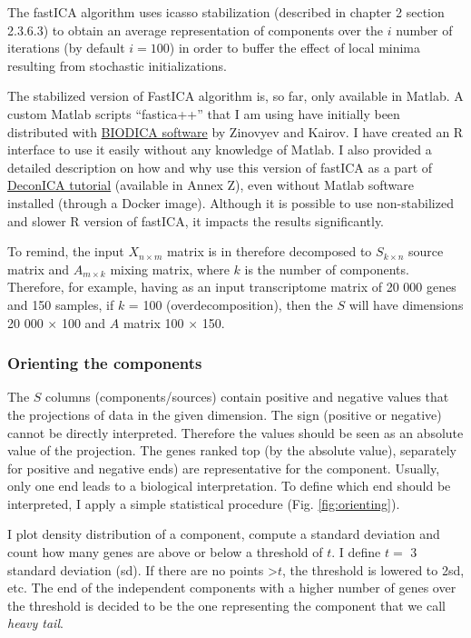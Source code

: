 \documentclass[12pt,]{book}
\theoremstyle{definition}
\theoremstyle{definition}
\theoremstyle{definition}
\theoremstyle{remark}
\begin{document}
The fastICA algorithm uses icasso stabilization (described in chapter 2
section 2.3.6.3) to obtain an average representation of components over
the \(i\) number of iterations (by default \(i=100\)) in order to buffer
the effect of local minima resulting from stochastic initializations.

The stabilized version of FastICA algorithm is, so far, only available
in Matlab. A custom Matlab scripts ``fastica++'' that I am using have
initially been distributed with
\href{https://github.com/LabBandSB/BIODICA}{BIODICA software} by
Zinovyev and Kairov. I have created an R interface to use it easily
without any knowledge of Matlab. I also provided a detailed description
on how and why use this version of fastICA as a part of
\href{https://urszulaczerwinska.github.io/DeconICA/Icasso.html}{DeconICA
tutorial} (available in Annex Z), even without Matlab software installed
(through a Docker image). Although it is possible to use non-stabilized
and slower R version of fastICA, it impacts the results significantly.

To remind, the input \(X_{n\times m}\) matrix is in therefore decomposed
to \(S_{k\times n}\) source matrix and \(A_{m \times k}\) mixing matrix,
where \(k\) is the number of components. Therefore, for example, having
as an input transcriptome matrix of 20 000 genes and 150 samples, if
\(k\) = 100 (overdecomposition), then the \(S\) will have dimensions 20
000 \(\times\) 100 and \(A\) matrix 100 \(\times\) 150.

\hypertarget{orienting-the-components}{%
\subsubsection{Orienting the
components}\label{orienting-the-components}}

The \(S\) columns (components/sources) contain positive and negative
values that the projections of data in the given dimension. The sign
(positive or negative) cannot be directly interpreted. Therefore the
values should be seen as an absolute value of the projection. The genes
ranked top (by the absolute value), separately for positive and negative
ends) are representative for the component. Usually, only one end leads
to a biological interpretation. To define which end should be
interpreted, I apply a simple statistical procedure (Fig.
\ref{fig:orienting}).

I plot density distribution of a component, compute a standard deviation
and count how many genes are above or below a threshold of \(t\). I
define \(t =\) 3 standard deviation (sd). If there are no points
\textgreater{}\(t\), the threshold is lowered to 2sd, etc. The end of
the independent components with a higher number of genes over the
threshold is decided to be the one representing the component that we
call \emph{heavy tail}.
\end{document}
